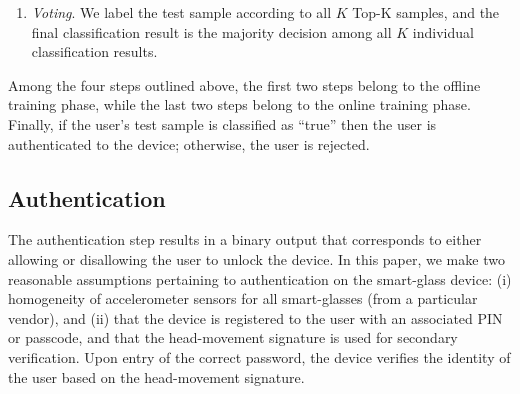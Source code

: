 \begin{enumerate}
\vspace{3pt}\item \emph{Voting}. We label the test sample according to all $K$ Top-K samples, and the final classification result is the majority decision among all $K$ individual classification results.



\end{enumerate}
Among the four steps outlined above, the first two steps belong to the offline training phase, while the last two steps belong to the online training phase.
Finally, if the user's test sample is classified as ``true'' then the user is authenticated to the device; otherwise, the user is rejected.


\iffalse
\subsection{Authentication}

The authentication step results in a binary output that corresponds to
either allowing or disallowing the user to unlock the device.
In this paper, we make two reasonable assumptions pertaining to authentication
on the smart-glass device: (i) homogeneity of
accelerometer sensors for all smart-glasses (from a particular vendor), and (ii)
that the device is registered to the user with an associated PIN or passcode,
and that the head-movement signature is used for secondary verification.
Upon entry of the correct password, the device verifies the identity
of the user based on the head-movement signature.

